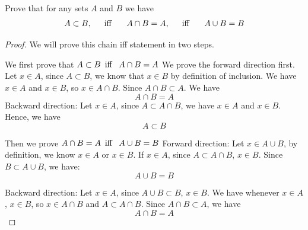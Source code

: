 \begin{minorEx}%
    Prove that for any sets $A$ and $B$ we have 
    $$
    A \subset B, \hspace{15pt} \text{\normalfont iff } \hspace{15pt} A \cap B =
    A, \hspace{15pt} \text{\normalfont iff } \hspace{15pt} A \cup B = B
    $$
\end{minorEx}

\begin{proof}
    We will prove this chain iff statement in two steps.

    We first prove that $A \subset B \hspace{5pt} \text{\normalfont iff }
    \hspace{5pt} A \cap B = A$ We prove the forward direction first.  Let $x \in
    A$, since $A \subset B$, we know that $x \in B$ by definition of inclusion.
    We have $x \in A$ and $x \in B$, so $x \in A \cap B$. Since $A \cap B
    \subset A$. We have $$A \cap B = A$$ Backward direction: Let $x \in A$,
    since $A \subset A \cap B$, we have $x \in A$ and $x \in B$. Hence, we have
    $$A \subset B$$

    Then we prove $A \cap B = A \hspace{5pt} \text{\normalfont iff }
    \hspace{5pt} A \cup B = B$ Forward direction: Let $x \in A \cup B$, by
    definition, we know $x \in A$ or $x \in B$. If $x \in A$, since $A \subset A
    \cap B$, $x \in B$. Since $B \subset A \cup B$, we have: $$A \cup B = B$$

    Backward direction: Let $x \in A$, since $A \cup B \subset B$, $x \in B$. We
    have whenever $x \in A$, $x \in B$, so $x \in A \cap B$ and $A \subset A
    \cap B$. Since $A \cap B \subset A$, we have $$A \cap B = A$$
\end{proof}            

